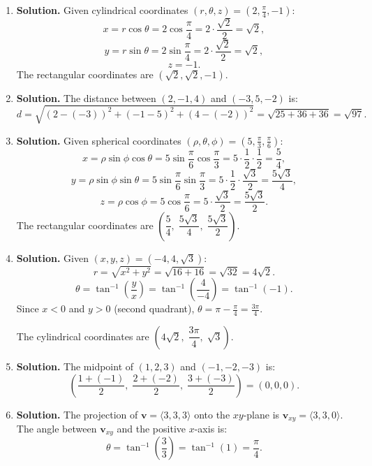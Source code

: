 \begin{enumerate}
\item \textbf{Solution.}
Given cylindrical coordinates \( (r, \theta, z) = \left(2, \frac{\pi}{4}, -1\right) \):
\[
x = r\cos\theta = 2\cos\frac{\pi}{4} = 2 \cdot \frac{\sqrt{2}}{2} = \sqrt{2},
\]
\[
y = r\sin\theta = 2\sin\frac{\pi}{4} = 2 \cdot \frac{\sqrt{2}}{2} = \sqrt{2},
\]
\[
z = -1.
\]
The rectangular coordinates are \( (\sqrt{2}, \sqrt{2}, -1) \).

\item \textbf{Solution.}
The distance between \( (2, -1, 4) \) and \( (-3, 5, -2) \) is:
\[
d = \sqrt{(2-(-3))^2 + (-1-5)^2 + (4-(-2))^2} = \sqrt{25 + 36 + 36} = \sqrt{97}.
\]

\item \textbf{Solution.}
Given spherical coordinates \( (\rho, \theta, \phi) = \left(5, \frac{\pi}{3}, \frac{\pi}{6}\right) \):
\[
x = \rho\sin\phi\cos\theta = 5\sin\frac{\pi}{6}\cos\frac{\pi}{3} = 5 \cdot \frac{1}{2} \cdot \frac{1}{2} = \frac{5}{4},
\]
\[
y = \rho\sin\phi\sin\theta = 5\sin\frac{\pi}{6}\sin\frac{\pi}{3} = 5 \cdot \frac{1}{2} \cdot \frac{\sqrt{3}}{2} = \frac{5\sqrt{3}}{4},
\]
\[
z = \rho\cos\phi = 5\cos\frac{\pi}{6} = 5 \cdot \frac{\sqrt{3}}{2} = \frac{5\sqrt{3}}{2}.
\]
The rectangular coordinates are \( \left(\dfrac{5}{4},\; \dfrac{5\sqrt{3}}{4},\; \dfrac{5\sqrt{3}}{2}\right) \).

\item \textbf{Solution.}
Given \( (x, y, z) = (-4, 4, \sqrt{3}) \):
\[
r = \sqrt{x^2 + y^2} = \sqrt{16 + 16} = \sqrt{32} = 4\sqrt{2}.
\]
\[
\theta = \tan^{-1}\!\left(\frac{y}{x}\right) = \tan^{-1}\!\left(\frac{4}{-4}\right) = \tan^{-1}(-1).
\]
Since \( x < 0 \) and \( y > 0 \) (second quadrant), \( \theta = \pi - \frac{\pi}{4} = \frac{3\pi}{4} \).

The cylindrical coordinates are \( \left(4\sqrt{2},\; \dfrac{3\pi}{4},\; \sqrt{3}\right) \).

\item \textbf{Solution.}
The midpoint of \( (1, 2, 3) \) and \( (-1, -2, -3) \) is:
\[
\left(\frac{1 + (-1)}{2},\; \frac{2 + (-2)}{2},\; \frac{3 + (-3)}{2}\right) = (0, 0, 0).
\]

\item \textbf{Solution.}
The projection of \( \mathbf{v} = \langle 3, 3, 3 \rangle \) onto the \( xy \)-plane is \( \mathbf{v}_{xy} = \langle 3, 3, 0 \rangle \). The angle between \( \mathbf{v}_{xy} \) and the positive \( x \)-axis is:
\[
\theta = \tan^{-1}\!\left(\frac{3}{3}\right) = \tan^{-1}(1) = \frac{\pi}{4}.
\]


\end{enumerate}
